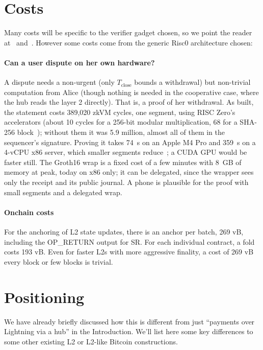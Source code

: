 \documentclass[11pt]{article}
\newcommand{\Tc}{T_{\mathrm{close}}}
\begin{document}
\section{Costs}
\label{sec:costs}

Many costs will be specific to the verifier gadget chosen, so we point the reader at~\cite{lichenbitvmx} and~\cite{lichenbabe}. However some costs come from the generic Risc0 architecture chosen:

\paragraph{Can a user dispute on her own hardware?} A dispute needs
a non-urgent (only $\Tc$ bounds
a withdrawal) but non-trivial computation from Alice (though nothing is needed in the cooperative case, where the hub
reads the layer 2 directly). That is, a proof of her withdrawal. As built,
the statement costs 389,020 zkVM cycles, one segment, using RISC Zero's
accelerators (about 10 cycles for a 256-bit modular multiplication, 68
for a SHA-256 block~\cite{risc0accel}); without them it was 5.9
million, almost all of them in the sequencer's signature. Proving it
takes 74~s on an Apple M4 Pro and 359~s on a
4-vCPU x86 server, which smaller
segments reduce~\cite{risc0data}; a CUDA GPU would be faster still. The Groth16 wrap is a fixed cost of a few minutes with 8~GB of memory at peak, today on x86
only; it can be delegated, since the wrapper sees only the receipt and
its public journal. A phone is plausible for the proof with small segments and a delegated wrap.

\paragraph{Onchain costs} For the anchoring of L2 state updates, there is an anchor per batch, 269 vB, including the OP\_RETURN output for SR. For each individual contract, a fold costs 193 vB. Even for faster L2s with more aggressive finality, a cost of 269 vB every block or few blocks is trivial.

\section{Positioning}
\label{sec:positioning}

We have already briefly discussed how this is different from just ``payments over Lightning via a hub'' in the Introduction. We'll list here some key differences to some other existing L2 or L2-like Bitcoin constructions.
\end{document}
